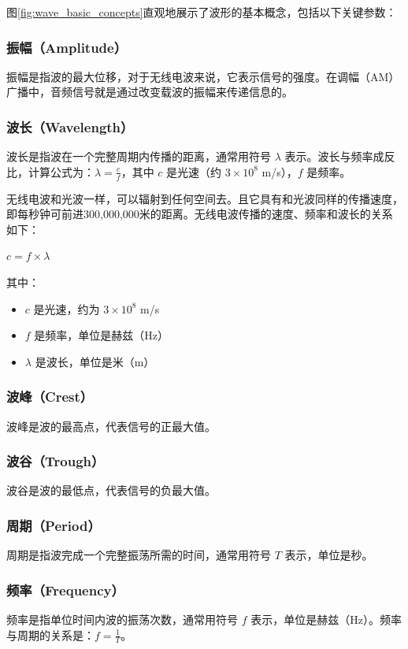 \documentclass[12pt,UTF8]{ctexbook}
\begin{document}
图\ref{fig:wave_basic_concepts}直观地展示了波形的基本概念，包括以下关键参数：

\subsubsection{振幅（Amplitude）}
振幅是指波的最大位移，对于无线电波来说，它表示信号的强度。在调幅（AM）广播中，音频信号就是通过改变载波的振幅来传递信息的。

\subsubsection{波长（Wavelength）}
波长是指波在一个完整周期内传播的距离，通常用符号 $\lambda$ 表示。波长与频率成反比，计算公式为：$\lambda = \frac{c}{f}$，其中 $c$ 是光速（约 $3 \times 10^8$ m/s），$f$ 是频率。

无线电波和光波一样，可以辐射到任何空间去。且它具有和光波同样的传播速度，即每秒钟可前进300,000,000米的距离。无线电波传播的速度、频率和波长的关系如下：

$c = f \times \lambda$

其中：
\begin{itemize}[leftmargin=3.5em]
    \item $c$ 是光速，约为 $3 \times 10^8$ m/s
    \item $f$ 是频率，单位是赫兹（Hz）
    \item $\lambda$ 是波长，单位是米（m）
\end{itemize}

\subsubsection{波峰（Crest）}
波峰是波的最高点，代表信号的正最大值。

\subsubsection{波谷（Trough）}
波谷是波的最低点，代表信号的负最大值。

\subsubsection{周期（Period）}
周期是指波完成一个完整振荡所需的时间，通常用符号 $T$ 表示，单位是秒。

\subsubsection{频率（Frequency）}
频率是指单位时间内波的振荡次数，通常用符号 $f$ 表示，单位是赫兹（Hz）。频率与周期的关系是：$f = \frac{1}{T}$。
\end{document}
